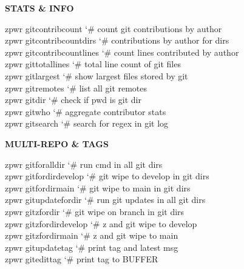 \documentclass[11pt,a4paper,twoside]{book}
\begin{document}
\vspace{12pt}
{\bfseries\color{neonyellow} STATS \& INFO}\vspace{4pt}

\begin{codebox}
\color{neongreen}zpwr gitcontribcount       {\char`\#} count git contributions by author\\
\color{neongreen}zpwr gitcontribcountdirs   {\char`\#} contributions by author for dirs\\
\color{neongreen}zpwr gitcontribcountlines  {\char`\#} count lines contributed by author\\
\color{neongreen}zpwr gittotallines         {\char`\#} total line count of git files\\
\color{neongreen}zpwr gitlargest            {\char`\#} show largest files stored by git\\
\color{neongreen}zpwr gitremotes            {\char`\#} list all git remotes\\
\color{neongreen}zpwr gitdir                {\char`\#} check if pwd is git dir\\
\color{neongreen}zpwr gitwho                {\char`\#} aggregate contributor stats\\
\color{neongreen}zpwr gitsearch             {\char`\#} search for regex in git log\\
\end{codebox}


\vspace{12pt}
{\bfseries\color{neonyellow} MULTI-REPO \& TAGS}\vspace{4pt}

\begin{codebox}
\color{neongreen}zpwr gitforalldir          {\char`\#} run cmd in all git dirs\\
\color{neongreen}zpwr gitfordirdevelop      {\char`\#} git wipe to develop in git dirs\\
\color{neongreen}zpwr gitfordirmain         {\char`\#} git wipe to main in git dirs\\
\color{neongreen}zpwr gitupdatefordir       {\char`\#} run git updates in all git dirs\\
\color{neongreen}zpwr gitzfordir            {\char`\#} git wipe on branch in git dirs\\
\color{neongreen}zpwr gitzfordirdevelop     {\char`\#} z and git wipe to develop\\
\color{neongreen}zpwr gitzfordirmain        {\char`\#} z and git wipe to main\\
\color{neongreen}zpwr gitupdatetag          {\char`\#} print tag and latest msg\\
\color{neongreen}zpwr gitedittag            {\char`\#} print tag to BUFFER\\
\end{codebox}
\end{document}
